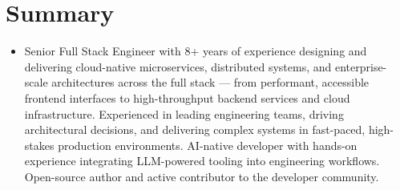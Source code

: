 \section{Summary}
  \begin{itemize}[leftmargin=0.15in, label={}]
    \item\small{
      Senior Full Stack Engineer with 8+ years of experience designing and delivering cloud-native microservices,
      distributed systems, and enterprise-scale architectures across the full stack — from performant, accessible
      frontend interfaces to high-throughput backend services and cloud infrastructure.
      Experienced in leading engineering teams, driving architectural decisions, and delivering complex systems
      in fast-paced, high-stakes production environments.
      AI-native developer with hands-on experience integrating LLM-powered tooling into engineering workflows.
      Open-source author and active contributor to the developer community.
    }
  \end{itemize}